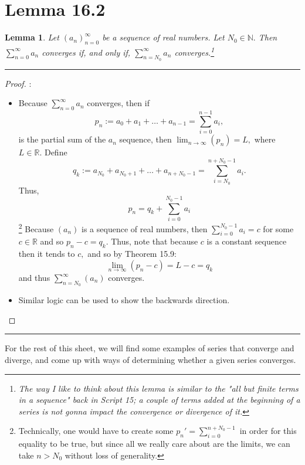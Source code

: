 \documentclass[openany, amssymb, psamsfonts]{amsart}
\newcommand{\bbN}{\mathbb{N}}
\newcommand{\bbR}{\mathbb{R}}
\newtheorem{lem}{Lemma}[section]
\theoremstyle{definition}
\numberwithin{equation}{section}
\begin{document}
\section*{Lemma 16.2}
\label{16.2}
\begin{lem} Let $(a_n)_{n=0}^\infty$ be a sequence of real numbers. Let $N_0\in \bbN.$ Then $\displaystyle\sum_{n=0}^\infty a_n$ converges if, and only if, $\displaystyle\sum_{n=N_0}^\infty a_n$ converges.\footnote{The way I like to think about this lemma is similar to the "all but finite terms in a sequence" back in Script 15; a couple of terms added at the beginning of a series is not gonna impact the convergence or divergence of it.}
\end{lem}
\vspace{4pt}     \hrule   \vspace{4pt} \begin{proof}:\\
\begin{itemize}
    \item Because $\displaystyle\sum_{n=0}^\infty a_n$ converges, then if \[p_n := a_{0} + a_{1} + \dots + a_{n-1} = \displaystyle\sum_{i=0}^{n-1} a_i,\] is the partial sum of the $a_n$ sequence, then $\displaystyle\lim_{n \to \infty}(p_n) = L,$ where $L \in \bbR.$
    Define \[q_k :=a_{N_0} + a_{N_0 + 1} + \dots + a_{n + N_0 -1} = \displaystyle\sum_{i = N_0}^{n + N_0 -1}a_i.\] Thus, \[p_n = q_k + \sum_{i=0}^{N_0 -1}a_i\]\footnote{Technically, one would have to create some $p_n' = \displaystyle\sum_{i=0}^{n+N_0-1}$ in order for this equality to be true, but since all we really care about are the limits, we can take $n>N_0$ without loss of generality.} Because $(a_n)$ is a sequence of real numbers, then $\displaystyle\sum_{i=0}^{N_0-1}a_i =c$ for some $c\in \bbR$ and so $p_n - c = q_k.$ Thus, note that because $c$ is a constant sequence then it tends to $c,$ and so by Theorem 15.9: \[\lim_{n\to \infty}(p_n - c) = L-c = q_k\] and thus $\displaystyle\sum_{n = N_0}^\infty(a_n)$ converges.
    \item Similar logic can be used to show the backwards direction.  
\end{itemize}
\end{proof}\vspace{4pt}     \hrule   \vspace{4pt} 


For the rest of this sheet, we will find some examples of series that converge and diverge, and come up with ways of determining whether a given series converges.
\end{document}
